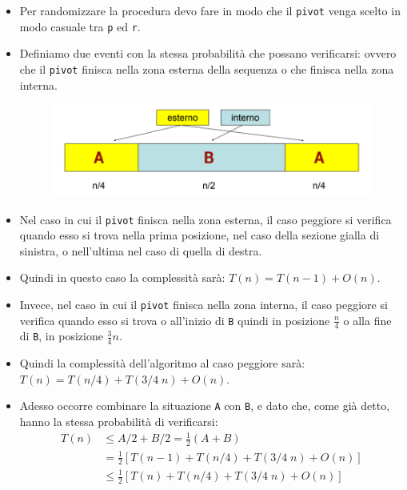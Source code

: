 \documentclass{article}
\begin{document}
\begin{itemize}
    \item Per randomizzare la procedura devo fare in modo che il \verb|pivot| venga scelto in modo casuale tra \verb|p| ed \verb|r|.
    \item Definiamo due eventi con la stessa probabilità che possano verificarsi: ovvero che il \verb|pivot| finisca nella zona esterna della sequenza o che finisca nella zona interna.
    \begin{figure}[h]
        \includegraphics[scale=0.6]{img/random_pivot.png}
        \centering
    \end{figure}
    \item Nel caso in cui il \verb|pivot| finisca nella zona esterna, il caso peggiore si verifica quando esso si trova nella prima posizione, nel caso della sezione gialla di sinistra, o nell'ultima nel caso di quella di destra.
    \item Quindi in questo caso la complessità sarà: $T(n) = T(n - 1) + O(n)$.
    \item Invece, nel caso in cui il \verb|pivot| finisca nella zona interna, il caso peggiore si verifica quando esso si trova o all'inizio di \verb|B| quindi in posizione $\frac{n}{4}$ o alla fine di \verb|B|, in posizione $\frac{3}{4}n$.
    \item Quindi la complessità dell'algoritmo al caso peggiore sarà: $T(n) = T(n/4) + T(3/4 \; n) + O(n)$.
    \item Adesso occorre combinare la situazione \verb|A| con \verb|B|, e dato che, come già detto, hanno la stessa probabilità di verificarsi:
    \begin{equation*}
        \begin{split}
            T(n) & \leq A/2 + B/2 = \frac{1}{2}(A + B) \\
            & = \frac{1}{2}[T(n - 1) + T(n/4) + T(3/4 \; n) + O(n)] \\
            & \leq \frac{1}{2}[T(n) + T(n/4) + T(3/4 \; n) + O(n)] \\
        \end{split}     
    \end{equation*}

\end{itemize}
\end{document}
